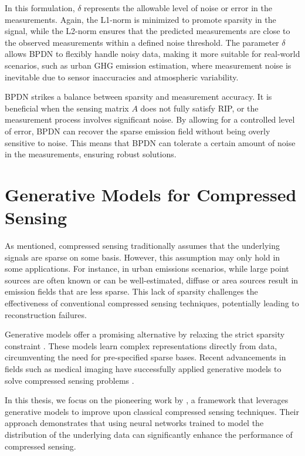 In this formulation, $\delta$ represents the allowable level of noise or error in the measurements.
Again, the L1-norm is minimized to promote sparsity in the signal, while the L2-norm ensures that the predicted measurements are close to the observed measurements within a defined noise threshold.
The parameter $\delta$ allows \gls{BPDN} to flexibly handle noisy data, making it more suitable for real-world scenarios, such as urban \gls{GHG} emission estimation, where measurement noise is inevitable due to sensor inaccuracies and atmospheric variability.

\gls{BPDN} strikes a balance between sparsity and measurement accuracy.
It is beneficial when the sensing matrix $A$ does not fully satisfy \gls{RIP}, or the measurement process involves significant noise.
By allowing for a controlled level of error, \gls{BPDN} can recover the sparse emission field without being overly sensitive to noise.
This means that \gls{BPDN} can tolerate a certain amount of noise in the measurements, ensuring robust solutions.

\section{Generative Models for Compressed Sensing}
\label{sec:cs_with_gen}

As mentioned, compressed sensing traditionally assumes that the underlying signals are sparse on some basis.
However, this assumption may only hold in some applications.
For instance, in urban emissions scenarios, while large point sources are often known or can be well-estimated, diffuse or area sources result in emission fields that are less sparse.
This lack of sparsity challenges the effectiveness of conventional compressed sensing techniques, potentially leading to reconstruction failures.

Generative models offer a promising alternative by relaxing the strict sparsity constraint \parencite{CSUsingAI}.
These models learn complex representations directly from data, circumventing the need for pre-specified sparse bases.
Recent advancements in fields such as medical imaging have successfully applied generative models to solve compressed sensing problems \parencite{ReviewCSUsingAI, CSUsingAI, SparseCSUsingAI}. %

In this thesis, we focus on the pioneering work by \textcite{CSUsingAI}, a framework that leverages generative models to improve upon classical compressed sensing techniques.
Their approach demonstrates that using neural networks trained to model the distribution of the underlying data can significantly enhance the performance of compressed sensing.

